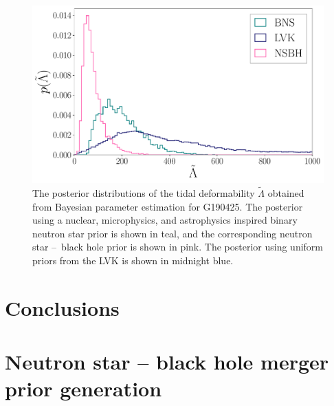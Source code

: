 \documentclass[twocolumn]{aastex631}
\begin{document}
	\begin{figure}
		\centering
		\includegraphics[width=1.\linewidth]{Fig_3_GW190425_lambda_tilde_posteriors.pdf}
		\caption{The posterior distributions of the tidal deformability $\tilde{\Lambda}$ obtained from Bayesian parameter estimation for G190425. The posterior using a nuclear, microphysics, and astrophysics inspired binary neutron star prior is shown in teal, and the corresponding neutron star --~black hole prior is shown in pink. 
			The posterior using uniform priors from the LVK is shown in midnight blue. }
		\label{fig:GW190425_tides}
	\end{figure}
	
	\section{Conclusions}
	
	\appendix
	
	\section{Neutron star -- black hole merger prior generation}\label{sec:NSBH generation}
	
	
\end{document}
